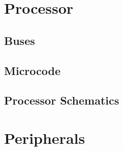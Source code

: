 




\renewcommand{\thepage}{\Alph{part}\arabic{chapter}-\arabic{page}}
\renewcommand{\thefigure}{\Alph{part}\arabic{chapter}.\arabic{figure}}
\renewcommand{\theschematic}{\Alph{part}\arabic{chapter}.\arabic{schematic}}
\renewcommand{\thetable}{\Alph{part}\arabic{chapter}.\arabic{schematic}}
\renewcommand{\thepage}{\thepart\thechapter-\arabic{page}}

\ifdefined\renderpartprocessor
  \part{Processor}
  \glsresetall

  

  \chapter{Buses}
  \glsresetall
  

 \chapter{Microcode}
 \glsresetall
 \label{chap:microcode}
 

 \chapter{Processor Schematics}
 \glsresetall
 \label{chap:processor-schematics}
 
  
\fi

\ifdefined\renderpartperipherals
\part{Peripherals}
  \ifdefined\renderchappfp

